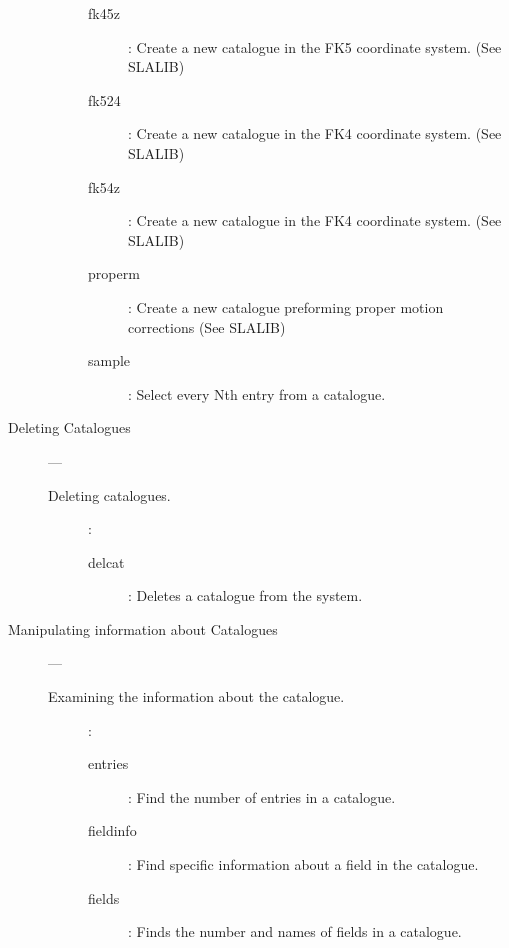 \begin{description}
\begin{description}
\begin{description}
\item [fk45z]:
 Create a new catalogue in the FK5 coordinate system. (See SLALIB)

\item [fk524]:
 Create a new catalogue in the FK4 coordinate system. (See SLALIB)

\item [fk54z]:
 Create a new catalogue in the FK4 coordinate system. (See SLALIB)

\item [properm]:
 Create a new catalogue preforming proper motion corrections (See SLALIB)

\item [sample]:
 Select every Nth entry from a catalogue.

\end{description}

\end{description}

\item [Deleting Catalogues] ---

\begin{description}

\item [Deleting catalogues.]:

\begin {description}

\item [delcat]:
 Deletes a catalogue from the system.

\end{description}

\end{description}

\item [Manipulating information about Catalogues] ---

\begin{description}

\item [Examining the information about the catalogue.]:

\begin {description}

\item [entries]:
 Find the number of entries in a catalogue.

\item [fieldinfo]:
 Find specific information about a field in the catalogue.

\item [fields]:
 Finds the number and names of fields in a catalogue.


\end{description}
\end{description}
\end{description}
